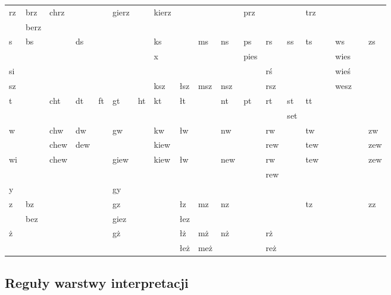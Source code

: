 \documentclass{article}
\begin{document}
\begin{longtable}{p{2mm}|p{2mm}p{4mm}p{2mm}p{1mm}p{3mm}p{2mm}p{3mm}p{2mm}p{4mm}p{3mm}p{3mm}p{2mm}p{2mm}p{2mm}p{1mm}p{1mm}p{1mm}p{4mm}}
\hline
rz & brz & chrz &  &  & gierz &  & kierz &  &  &  & prz &  &  & trz &  &  &  & \\
 & berz &  &  &  &  &  &  &  &  &  &  &  &  &  &  &  &  & \\
\hline
s & bs &  & ds &  &  &  & ks &  & ms & ns & ps & rs & ss & ts &  & ws &  & zs\\
 &  &  &  &  &  &  & x &  &  &  & pies &  &  &  &  & wies &  & \\
\hline
si &  &  &  &  &  &  &  &  &  &  &  & rś &  &  &  & wieś &  & \\
\hline
sz &  &  &  &  &  &  & ksz & łsz & msz & nsz &  & rsz &  &  &  & wesz &  & \\
\hline
t &  & cht & dt & ft & gt & ht & kt & łt &  & nt & pt & rt & st & tt &  &  &  & \\
 &  &  &  &  &  &  &  &  &  &  &  &  & set &  &  &  &  & \\
\hline
w &  & chw & dw &  & gw &  & kw & łw &  & nw &  & rw &  & tw &  &  &  & zw\\
 &  & chew & dew &  &  &  & kiew &  &  &  &  & rew &  & tew &  &  &  & zew\\
\hline
wi &  & chew &  &  & giew &  & kiew & łw &  & new &  & rw &  & tew &  &  &  & zew\\
 &  &  &  &  &  &  &  &  &  &  &  & rew &  &  &  &  &  & \\
\hline
y &  &  &  &  & gy &  &  &  &  &  &  &  &  &  &  &  &  & \\
\hline
z & bz &  &  &  & gz &  &  & łz & mz & nz &  &  &  & tz &  &  &  & zz\\
 & bez &  &  &  & giez &  &  & łez &  &  &  &  &  &  &  &  &  & \\
\hline
ż &  &  &  &  & gż &  &  & łż & mż & nż &  & rż &  &  &  &  &  & \\
 &  &  &  &  &  &  &  & łeż & meż &  &  & reż &  &  &  &  &  & \\
\hline
\end{longtable}

\subsection{Reguły warstwy interpretacji}
\end{document}
